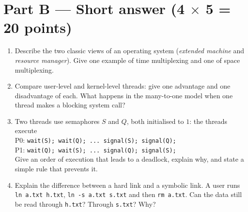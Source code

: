 \documentclass[11pt,a4paper]{article}
\newcommand{\cmd}[1]{\texttt{#1}}
\begin{document}
\section*{Part B --- Short answer \hfill (4 $\times$ 5 = 20 points)}
\begin{enumerate}[leftmargin=2.0em,label=B\arabic*.,itemsep=0.3em]
  \item Describe the two classic views of an operating system (\emph{extended machine} and \emph{resource manager}). Give one example of time multiplexing and one of space multiplexing. 
  \ans{2.7cm}
  \item Compare user-level and kernel-level threads: give one advantage and one disadvantage of each. What happens in the many-to-one model when one thread makes a blocking system call? 
  \ans{2.7cm}
  \item Two threads use semaphores $S$ and $Q$, both initialised to $1$: the threads execute\\[0.2em]
  \hspace*{1em}P0: \texttt{wait(S); wait(Q); ... signal(S); signal(Q);}\\
  \hspace*{1em}P1: \texttt{wait(Q); wait(S); ... signal(Q); signal(S);}\\[0.2em]
  Give an order of execution that leads to a deadlock, explain why, and state a simple rule that prevents it. 
  \ans{2.7cm}
  \item Explain the difference between a hard link and a symbolic link. A user runs \cmd{ln a.txt h.txt}, \cmd{ln -s a.txt s.txt} and then \cmd{rm a.txt}. Can the data still be read through \texttt{h.txt}? Through \texttt{s.txt}? Why? 
  \ans{2.7cm}
\end{enumerate}

\newpage
\end{document}
